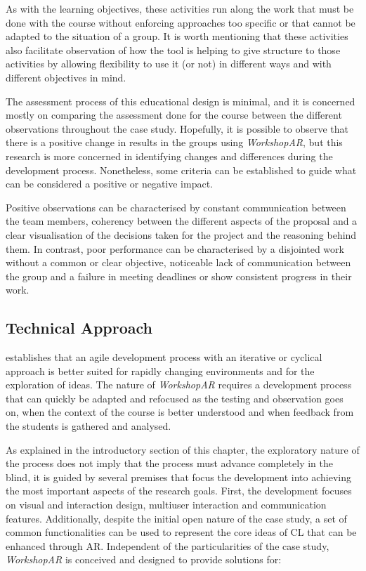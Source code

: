 As with the learning objectives, these activities run along the work that must be done with the course without enforcing approaches too specific or that cannot be adapted
to the situation of a group. It is worth mentioning that these activities also facilitate observation of how the tool is helping to give structure to those activities by
allowing flexibility to use it (or not) in different ways and with different objectives in mind.

The assessment process of this educational design is minimal, and it is concerned mostly on comparing the assessment done for the course between the different observations
throughout the case study. Hopefully, it is possible to observe that there is a positive change in results in the groups using \emph{WorkshopAR}, but this research is more
concerned in identifying changes and differences during the development process. Nonetheless, some criteria can be established to guide what can be considered a positive
or negative impact.

Positive observations can be characterised by constant communication between the team members, coherency between the different aspects of the proposal and a clear
visualisation of the decisions taken for the project and the reasoning behind them. In contrast, poor performance can be characterised by a disjointed work without a
common or clear objective, noticeable lack of communication between the group and a failure in meeting deadlines or show consistent progress in their work.

\subsection{Technical Approach \label{sec:3-3-2}}

\textcite{yadav_2015} establishes that an agile development process with an iterative or cyclical approach is better suited for rapidly changing environments and for the
exploration of ideas. The nature of \emph{WorkshopAR} requires a development process that can quickly be adapted and refocused as the testing and observation goes on, when the
context of the course is better understood and when feedback from the students is gathered and analysed.

As explained in the introductory section of this chapter, the exploratory nature of the process does not imply that the process must advance completely in the blind, it is
guided by several premises that focus the development into achieving the most important aspects of the research goals. First, the development focuses on visual and
interaction design, multiuser interaction and communication features. Additionally, despite the initial open nature of the case study, a set of common functionalities can
be used to represent the core ideas of \ac{CL} that can be enhanced through \ac{AR}. Independent of the particularities of the case study, \emph{WorkshopAR} is conceived and
designed to provide solutions for:

